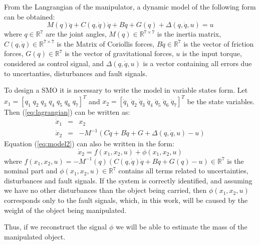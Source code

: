 \documentclass[conference,letterpaper]{ieeeconf}
\begin{document}
From the Langrangian of the manipulator, a dynamic model of the following form can be obtained:
  \begin{equation}
    M(q)\ddot{q} + C(q, \dot{q})\dot{q} + B\dot{q} + G(q) + \Delta(q,\dot{q}, u) = u
    \label{eq:lagrangian}
  \end{equation}
  where $q\in \mathbb{R}^7$ are the joint angles, $M(q)\in \mathbb{R}^{7\times 7}$ is the inertia matrix, $C(q,\dot{q})\in \mathbb{R}^{7\times 7}$ is the Matrix of Coriollis forces, $B\dot{q}\in \mathbb{R}^7$ is the vector of friction forces, $G(q)\in\mathbb{R}^7$ is the vector of gravitational forces, $u$ is the input torque, considered as control signal, and $\Delta(q,\dot{q},u)$ is a vector containing all errors due to uncertanties, disturbances and fault signals.
  
  To design a SMO it is necessary to write the model in variable states form. Let $x_1 = [q_1\;q_2\;q_3\;q_4\;q_5\;q_6\;q_7]^T$ and $x_2 = [\dot{q}_1\;\dot{q}_2\;\dot{q}_3\;\dot{q}_4\;\dot{q}_5\;\dot{q}_6\;\dot{q}_7]^T$ be the state variables. Then (\ref{eq:lagrangian}) can be written as:
  \begin{eqnarray}
    \dot{x}_1 &=& x_2\label{eq:model1}\\
    \dot{x}_2 &=& -M^{-1}\left(C\dot{q} + B\dot{q} + G + \Delta(q,\dot{q},u) - u\right)\label{eq:model2}
  \end{eqnarray}
Equation (\ref{eq:model2}) can also be written in the form:
  \begin{equation*}
    \dot{x}_2 = f(x_1, x_2, u) + \phi(x_1, x_2, u)
  \end{equation*}
  where $f(x_1, x_2, u) = -M^{-1}(q)\left(C(q, \dot{q})\dot{q} + B\dot{q} + G(q) - u\right) \in \mathbb{R}^7$ is the nominal part and $\phi(x_1, x_2, u) \in \mathbb{R}^7$ contains all terms related to uncertainties, disturbances and fault signals. If the system is correctly identified, and assuming we have no other disturbances than the object being carried, then $\phi(x_1, x_2, u)$ corresponds only to the fault signals, which, in this work, will be caused by the weight of the object being manipulated.

  Thus, if we reconstruct the signal $\phi$ we will be able to estimate the mass of the manipulated object. 
\end{document}
